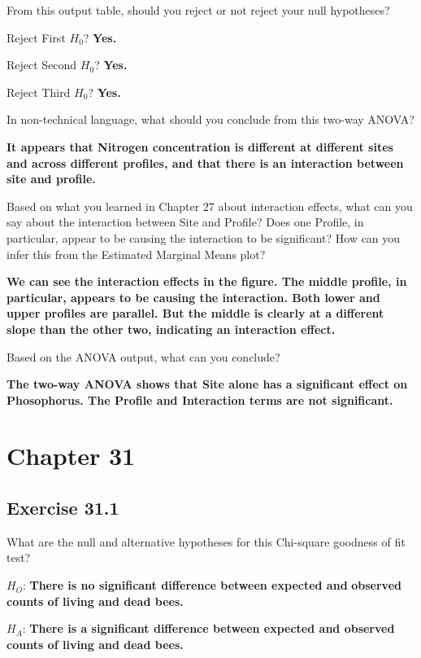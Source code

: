 \documentclass[
  openany]{krantz}
\begin{document}
From this output table, should you reject or not reject your null hypotheses?

Reject First \(H_{0}\)? \textbf{Yes.}

Reject Second \(H_{0}\)? \textbf{Yes.}

Reject Third \(H_{0}\)? \textbf{Yes.}

In non-technical language, what should you conclude from this two-way ANOVA?

\textbf{It appears that Nitrogen concentration is different at different sites and across different profiles, and that there is an interaction between site and profile.}

Based on what you learned in Chapter 27 about interaction effects, what can you say about the interaction between Site and Profile? Does one Profile, in particular, appear to be causing the interaction to be significant? How can you infer this from the Estimated Marginal Means plot?

\textbf{We can see the interaction effects in the figure. The middle profile, in particular, appears to be causing the interaction. Both lower and upper profiles are parallel. But the middle is clearly at a different slope than the other two, indicating an interaction effect.}

Based on the ANOVA output, what can you conclude?

\textbf{The two-way ANOVA shows that Site alone has a significant effect on Phosophorus. The Profile and Interaction terms are not significant.}

\hypertarget{chapter-31}{%
\section{Chapter 31}\label{chapter-31}}

\hypertarget{exercise-31.1}{%
\subsection{Exercise 31.1}\label{exercise-31.1}}

What are the null and alternative hypotheses for this Chi-square goodness of fit test?

\(H_{O}\): \textbf{There is no significant difference between expected and}
\textbf{observed counts of living and dead bees.}

\(H_{A}\): \textbf{There is a significant difference between expected and observed counts of living and dead bees.}
\end{document}
